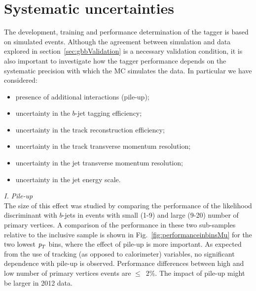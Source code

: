 \section{Systematic uncertainties}\label{sec:gbbSystematics}
The development, training and performance determination of the tagger is based on simulated events. Although the agreement between simulation and data explored in section~\ref{sec:gbbValidation} is a necessary validation condition, it is also important to investigate how the tagger performance depends %
 on the systematic precision with which the MC simulates the data. In particular we have considered:
%
%
\begin{itemize}\addtolength{\itemsep}{-0.4\baselineskip}
\item
presence of additional interactions (pile-up);
\item
uncertainty in the $b$-jet tagging efficiency; %
\item
uncertainty in the track reconstruction efficiency;
\item
uncertainty in the track transverse momentum resolution;
\item
uncertainty in the jet transverse momentum resolution;
\item
uncertainty in the jet energy scale.
\end{itemize}

{ \em I. Pile-up}
\\[3mm]
  The size of this effect was studied by comparing the performance of the likelihood discriminant with $b$-jets in events with small (1-9) and large (9-20) number of primary vertices. 
A comparison of the performance in these two sub-samples relative to the inclusive sample is shown in Fig.~\ref{fig:performanceinbinsMu} for the two lowest ${\emph{p}_{T}}$ bins, where the effect of pile-up is more important.
As expected from the use of tracking (as opposed to calorimeter) variables, no significant dependence with pile-up is observed. %
Performance differences between high and low number of primary vertices events are $\leq$~2\%. %
The impact of pile-up might be larger in 2012 data.

